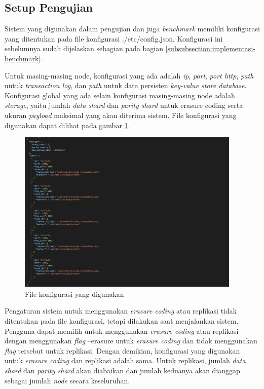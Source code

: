 \subsection{Setup Pengujian}
\label{subsection:setup-pengujian}

Sistem yang digunakan dalam pengujian dan juga \textit{benchmark} memiliki konfigurasi yang ditentukan pada file konfigurasi ./etc/config.json. Konfigurasi ini sebelumnya sudah dijelaskan sebagian pada bagian \ref{subsubsection:implementasi-benchmark}.

Untuk masing-masing node, konfigurasi yang ada adalah \textit{ip}, \textit{port}, \textit{port http}, \textit{path} untuk \textit{transaction log}, dan \textit{path} untuk data persisten \textit{key-value store database}. Konfigurasi global yang ada selain konfigurasi masing-masing node adalah \textit{storage}, yaitu jumlah \textit{data shard} dan \textit{parity shard} untuk erasure coding serta ukuran \textit{payload} maksimal yang akan diterima sistem. File konfigurasi yang digunakan dapat dilihat pada gambar \ref{fig:config-json}.

\begin{figure}[ht]
    \centering
    \includegraphics[width=0.95\textwidth]{resources/chapter-4/konfigurasi.png}
    \caption{File konfigurasi yang digunakan}
    \label{fig:config-json}
\end{figure}

Pengaturan sistem untuk menggunakan \textit{erasure coding} atau replikasi tidak ditentukan pada file konfigurasi, tetapi dilakukan saat menjalankan sistem. Pengguna dapat memilih untuk menggunakan \textit{erasure coding} atau
replikasi dengan menggunakan \textit{flag} --erasure untuk \textit{erasure coding} dan tidak menggunakan \textit{flag} tersebut untuk replikasi. Dengan demikian, konfigurasi yang digunakan untuk \textit{erasure coding} dan replikasi adalah sama. Untuk replikasi, jumlah \textit{data shard} dan \textit{parity shard} akan diabaikan dan jumlah keduanya akan dianggap sebagai jumlah \textit{node} secara keseluruhan.